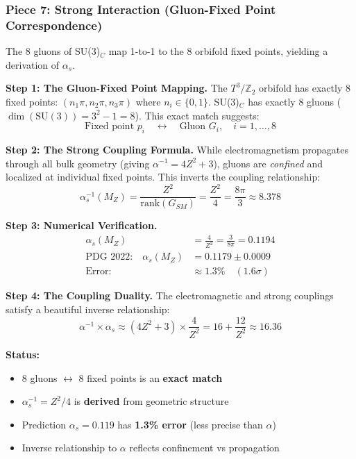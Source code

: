 \documentclass[12pt,a4paper]{article}
\newcommand{\Zsq}{Z^2}
\begin{document}
\subsubsection{Piece 7: Strong Interaction (Gluon-Fixed Point Correspondence)}

The 8 gluons of SU(3)$_C$ map 1-to-1 to the 8 orbifold fixed points, yielding a derivation of $\alpha_s$.

\textbf{Step 1: The Gluon-Fixed Point Mapping.}
The $T^3/\mathbb{Z}_2$ orbifold has exactly 8 fixed points: $(n_1\pi, n_2\pi, n_3\pi)$ where $n_i \in \{0,1\}$. SU(3)$_C$ has exactly 8 gluons ($\dim(\text{SU}(3)) = 3^2 - 1 = 8$). This exact match suggests:
\begin{equation}
\text{Fixed point } p_i \quad \leftrightarrow \quad \text{Gluon } G_i, \quad i = 1, \ldots, 8
\end{equation}

\textbf{Step 2: The Strong Coupling Formula.}
While electromagnetism propagates through all bulk geometry (giving $\alpha^{-1} = 4\Zsq + 3$), gluons are \textit{confined} and localized at individual fixed points. This inverts the coupling relationship:
\begin{equation}
\boxed{\alpha_s^{-1}(M_Z) = \frac{\Zsq}{\text{rank}(G_{SM})} = \frac{\Zsq}{4} = \frac{8\pi}{3} \approx 8.378}
\end{equation}

\textbf{Step 3: Numerical Verification.}
\begin{align}
\alpha_s(M_Z) &= \frac{4}{\Zsq} = \frac{3}{8\pi} = 0.1194 \\
\text{PDG 2022:} \quad \alpha_s(M_Z) &= 0.1179 \pm 0.0009 \\
\text{Error:} &\approx 1.3\% \quad (1.6\sigma)
\end{align}

\textbf{Step 4: The Coupling Duality.}
The electromagnetic and strong couplings satisfy a beautiful inverse relationship:
\begin{equation}
\alpha^{-1} \times \alpha_s \approx (4\Zsq + 3) \times \frac{4}{\Zsq} = 16 + \frac{12}{\Zsq} \approx 16.36
\end{equation}

\textbf{Status:}
\begin{itemize}[itemsep=0pt]
    \item[\checkmark] 8 gluons $\leftrightarrow$ 8 fixed points is an \textbf{exact match}
    \item[\checkmark] $\alpha_s^{-1} = \Zsq/4$ is \textbf{derived} from geometric structure
    \item[$\sim$] Prediction $\alpha_s = 0.119$ has \textbf{1.3\% error} (less precise than $\alpha$)
    \item[\checkmark] Inverse relationship to $\alpha$ reflects confinement vs propagation
\end{itemize}
\end{document}
